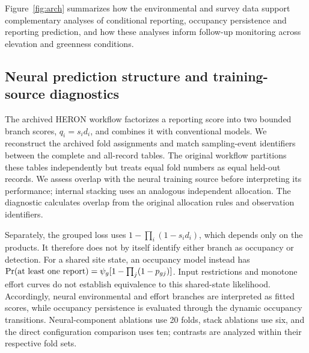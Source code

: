 

Figure~\ref{fig:arch} summarizes how the environmental and survey data support complementary analyses of conditional reporting, occupancy persistence and reporting prediction, and how these analyses inform follow-up monitoring across elevation and greenness conditions.

\FloatBarrier

\subsection{Neural prediction structure and training-source diagnostics}
\label{sec:audit}
The archived HERON workflow factorizes a reporting score into two bounded branch scores, $q_i=s_i d_i$, and combines it with conventional models. We reconstruct the archived fold assignments and match sampling-event identifiers between the complete and all-record tables. The original workflow partitions these tables independently but treats equal fold numbers as equal held-out records. We assess overlap with the neural training source before interpreting its performance; internal stacking uses an analogous independent allocation. The diagnostic calculates overlap from the original allocation rules and observation identifiers.

Separately, the grouped loss uses $1-\prod_i(1-s_i d_i)$, which depends only on the products. It therefore does not by itself identify either branch as occupancy or detection. For a shared site state, an occupancy model instead has $\Pr(\hbox{at least one report})=\psi_g[1-\prod_j(1-p_{gj})]$. Input restrictions and monotone effort curves do not establish equivalence to this shared-state likelihood. Accordingly, neural environmental and effort branches are interpreted as fitted scores, while occupancy persistence is evaluated through the dynamic occupancy transitions. Neural-component ablations use 20 folds, stack ablations use six, and the direct configuration comparison uses ten; contrasts are analyzed within their respective fold sets.

